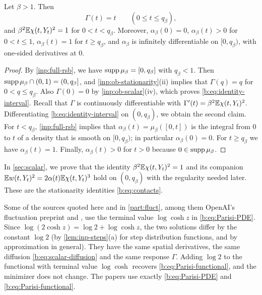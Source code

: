\begin{corollary}[The interval on which $\Gamma(t)=t$]\label{cor:inp-identity}
Let $\beta>1$. Then
\begin{equation}\label{b:eq:identity-interval}
 \Gamma(t)=t\qquad(0\le t\le q_\beta),
\end{equation}
and $\beta^2\mathbb E\chi(t,Y_t)^2=1$ for $0<t<q_\beta$. Moreover, $\alpha_\beta(0)=0$,
$\alpha_\beta(t)>0$ for $0<t\le1$, $\alpha_\beta(t)=1$ for $t\ge q_\beta$, and
$\alpha_\beta$ is infinitely differentiable on $[0,q_\beta)$, with one-sided
derivatives at $0$.
\end{corollary}

\begin{proof}
By \cref{inp:full-rsb}, we have $\operatorname{supp}\mu_\beta=[0,q_\beta]$ with $q_\beta<1$.
Then $\operatorname{supp}\mu_\beta\cap(0,1)=(0,q_\beta]$, and \cref{inp:ob-stationarity}(ii)
implies that $\Gamma(q)=q$ for $0<q\le q_\beta$. Also $\Gamma(0)=0$ by
\cref{inp:ob-scalar}(iv), which proves \eqref{b:eq:identity-interval}. Recall
that $\Gamma$ is continuously differentiable with
$\Gamma'(t)=\beta^2\mathbb E\chi(t,Y_t)^2$. Differentiating
\eqref{b:eq:identity-interval} on $(0,q_\beta)$, we obtain the second claim. For
$t<q_\beta$, \cref{inp:full-rsb} implies that $\alpha_\beta(t)=\mu_\beta([0,t])$ is
the integral from $0$ to $t$ of a density that is smooth on $[0,q_\beta)$; in
particular $\alpha_\beta(0)=0$. For $t\ge q_\beta$ we have $\alpha_\beta(t)=1$.
Finally, $\alpha_\beta(t)>0$ for $t>0$ because $0\in\operatorname{supp}\mu_\beta$.
\end{proof}

In \cref{sec:scalar}, we prove that the identity $\beta^2\mathbb E\chi(t,Y_t)^2=1$ and
its companion $\mathbb E w(t,Y_t)^2=2\alpha(t)\mathbb E\chi(t,Y_t)^3$ hold on $(0,q_\beta)$
with the regularity needed later. These are the stationarity identities
\eqref{b:eq:contacts}.

\begin{remark}\label{rem:inp-logcosh}
Some of the sources quoted here and in \cref{part:fluct}, among them
OpenAI's fluctuation preprint \cite{oai-fluctuations} and \cite{full-rsb}, use
the terminal value $\log\cosh z$ in \eqref{b:eq:Parisi-PDE}. Since
$\log(2\cosh z)=\log2+\log\cosh z$, the two solutions differ by the constant
$\log2$ (by \cref{lem:inp-steps}(a) for step distribution functions, and by
approximation in general). They have the same spatial derivatives, the same
diffusion \eqref{b:eq:scalar-diffusion} and the same response $\Gamma$. Adding
$\log2$ to the functional with terminal value $\log\cosh$ recovers
\eqref{b:eq:Parisi-functional}, and the minimizer does not change. The papers
\cite{quantitative-parisi,hexagon-bias} use exactly
\eqref{b:eq:Parisi-PDE} and \eqref{b:eq:Parisi-functional}.
\end{remark}


